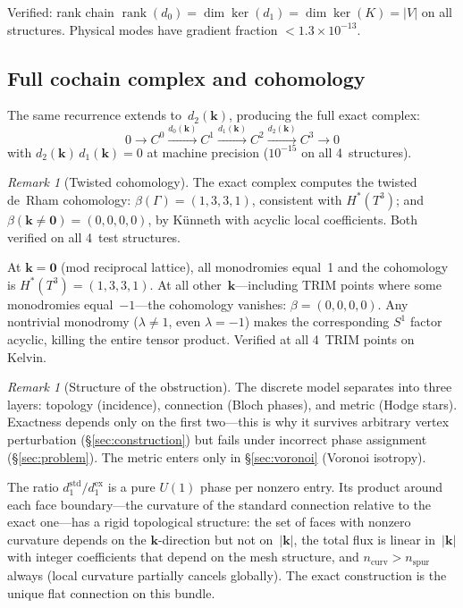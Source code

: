 \documentclass[12pt]{article}
\theoremstyle{definition}
\theoremstyle{remark}
\newtheorem{remark}[theorem]{Remark}
\newcommand{\kk}{\mathbf{k}}
\DeclareMathOperator{\rank}{rank}
\DeclareMathOperator{\cker}{ker}
\begin{document}
Verified: rank chain
$\rank(d_0) = \dim\cker(d_1) = \dim\cker(K) = |V|$ on all structures.
Physical modes have gradient fraction $< 1.3 \times 10^{-13}$.

\subsection{Full cochain complex and cohomology}

The same recurrence extends to~$d_2(\kk)$, producing the full exact complex:
\[
  0 \to C^0 \xrightarrow{d_0(\kk)} C^1 \xrightarrow{d_1(\kk)} C^2
    \xrightarrow{d_2(\kk)} C^3 \to 0
\]
with $d_2(\kk)\,d_1(\kk) = 0$ at machine precision ($10^{-15}$ on all
4~structures).

\begin{remark}[Twisted cohomology]
The exact complex computes the twisted de~Rham cohomology:
$\beta(\Gamma) = (1,3,3,1)$, consistent with $H^*(T^3)$; and
$\beta(\kk \neq \mathbf{0}) = (0,0,0,0)$, by K\"unneth with acyclic local
coefficients. Both verified on all 4~test structures.

At $\kk = \mathbf{0}$ (mod reciprocal lattice), all monodromies equal~1 and
the cohomology is $H^*(T^3) = (1,3,3,1)$. At all other~$\kk$---including TRIM
points where some monodromies equal~$-1$---the cohomology vanishes:
$\beta = (0,0,0,0)$. Any nontrivial monodromy ($\lambda \neq 1$, even
$\lambda = -1$) makes the corresponding $S^1$ factor acyclic, killing the
entire tensor product. Verified at all 4~TRIM points on Kelvin.
\end{remark}

\begin{remark}[Structure of the obstruction]\label{rem:curvature}
The discrete model separates into three layers: topology (incidence),
connection (Bloch phases), and metric (Hodge stars). Exactness depends only on
the first two---this is why it survives arbitrary vertex perturbation
(\S\ref{sec:construction}) but fails under incorrect phase assignment
(\S\ref{sec:problem}). The metric enters only in \S\ref{sec:voronoi}
(Voronoi isotropy).

The ratio $d_1^{\mathrm{std}} / d_1^{\mathrm{ex}}$ is a pure $U(1)$ phase per
nonzero entry. Its product around each face boundary---the curvature of the
standard connection relative to the exact one---has a rigid topological
structure: the set of faces with nonzero curvature depends on the
$\kk$-direction but not on~$|\kk|$, the total flux is linear in~$|\kk|$ with
integer coefficients that depend on the mesh structure, and
$n_{\mathrm{curv}} > n_{\mathrm{spur}}$ always (local curvature partially
cancels globally). The exact construction is the unique flat connection on this
bundle.
\end{remark}
\end{document}
